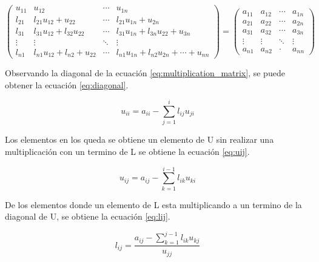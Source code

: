 \begin{equation}
    \begin{pmatrix}
        u_{11} & u_{12}                     & \cdots & u_{1n}                                  \\
        l_{21} & l_{21}u_{12}+u_{22}        & \cdots & l_{21}u_{1n}+u_{2n}                     \\
        l_{31} & l_{31}u_{12}+l_{32}u_{22}  & \cdots & l_{31}u_{1n}+l_{3n}u_{22}+u_{3n}        \\
        \vdots & \vdots                     & \ddots & \vdots                                  \\
        l_{n1} & l_{n1}u_{12}+l_{n2}+u_{22} & \cdots & l_{n1}u_{1n}+l_{n2}u_{2n}+\cdots+u_{nn}
    \end{pmatrix}=
    \begin{pmatrix}
        a_{11} & a_{12} & \cdots & a_{1n} \\
        a_{21} & a_{22} & \cdots & a_{2n} \\
        a_{31} & a_{32} & \cdots & a_{3n} \\
        \vdots & \vdots & \ddots & \vdots \\
        a_{n1} & a_{n2} & \cdot  & a_{nn}
    \end{pmatrix}
    \label{eq:multiplication_matrix}
\end{equation}

Observando la diagonal de la ecuación \ref{eq:multiplication_matrix}, se puede obtener la ecuación \ref{eq:diagonal}.

\begin{equation}
    u_{ii} = a_{ii} - \sum_{j=1}^i l_{ij}u_{ji}
    \label{eq:diagonal}
\end{equation}

Los elementos en los queda se obtiene un elemento de U sin realizar una multiplicación con un termino de L se obtiene la ecuación \ref{eq:uij}.

\begin{equation}
    u_{ij} = a_{ij} - \sum_{k=1}^{i-1} l_{ik}u_{ki} \label{eq:uij}
\end{equation}

De los elementos donde un elemento de L esta multiplicando a un termino de la diagonal de U, se obtiene la ecuación \ref{eq:lij}.

\begin{equation}
    l_{ij} = \frac{a_{ij}-\sum\limits_{k=1}^{j-1} l_{ik}u_{kj}}{u_{jj}} \label{eq:lij}
\end{equation}